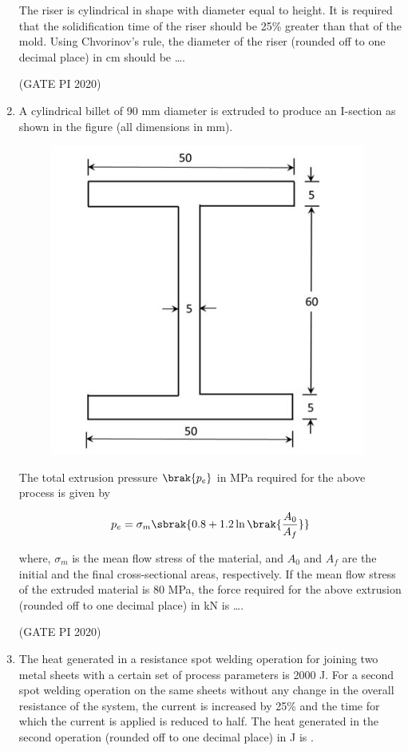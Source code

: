 \documentclass[journal,12pt,onecolumn]{IEEEtran}
\theoremstyle{remark}
\begin{document}
\begin{enumerate}
The riser is cylindrical in shape with diameter equal to height. It is required that the solidification time of the riser should be 25\% greater than that of the mold. Using Chvorinov's rule, the diameter of the riser (rounded off to one decimal place) in cm should be \dots.

\hfill (GATE PI 2020)

\item A cylindrical billet of 90 mm diameter is extruded to produce an I-section as shown in the figure (all dimensions in mm).
\begin{figure}[H]
    \centering
    \includegraphics[width=0.5\columnwidth]{figs/fig17.png}
    \caption{}
    \label{fig:placeholder}
\end{figure}

The total extrusion pressure $\brak{p_e}$ in MPa required for the above process is given by

\begin{align*}
p_e = \sigma_m \sbrak{ 0.8 + 1.2 \ln \brak{\frac{A_0}{A_f}}}
\end{align*}

where, $\sigma_m$ is the mean flow stress of the material, and $A_0$ and $A_f$ are the initial and the final cross-sectional areas, respectively. If the mean flow stress of the extruded material is 80 MPa, the force required for the above extrusion (rounded off to one decimal place) in kN is \dots.

\hfill (GATE PI 2020)

\item The heat generated in a resistance spot welding operation for joining two metal sheets with a certain set of process parameters is 2000 J. For a second spot welding operation on the same sheets without any change in the overall resistance of the system, the current is increased by 25\% and the time for which the current is applied is reduced to half. The heat generated in the second operation (rounded off to one decimal place) in J is .


\end{enumerate}
\end{document}
